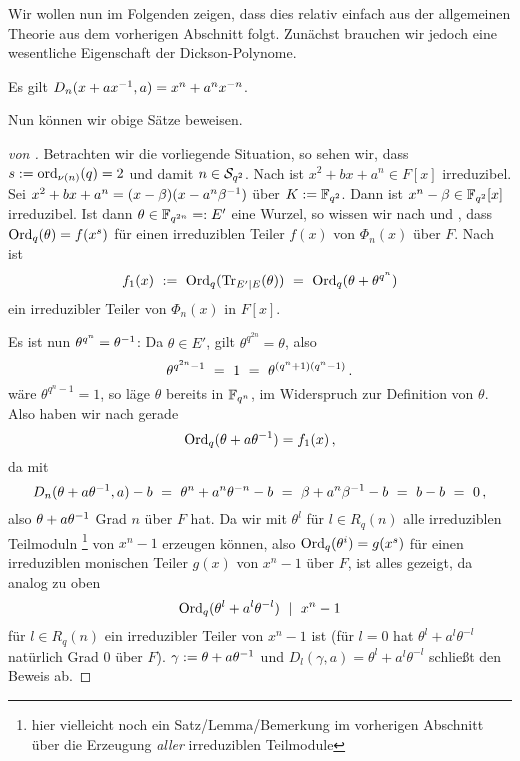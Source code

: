 Wir wollen nun im Folgenden zeigen, dass dies relativ einfach aus der
allgemeinen Theorie aus dem vorherigen Abschnitt folgt.
Zunächst brauchen wir jedoch eine wesentliche Eigenschaft der Dickson-Polynome.

\begin{lemma}[{??}]
  \label{lemma:dickson:dickson_polynome_potenz}
  Es gilt $D_n(x+a x\inv,a) = x^n + a^n x^{-n}$.
\end{lemma}

Nun können wir obige Sätze beweisen.

\begin{proof}[von ]
  Betrachten wir die vorliegende Situation, so sehen wir, dass
  $s := \ord_{\nu(n)}(q) = 2$ und damit $n \in \S_{q^2}$.
  Nach \thref{} ist $x^2 +bx+a^n \in F[x]$ irreduzibel. Sei 
  $x^2+bx+a^n = (x -\beta)(x -a^n\beta\inv)$ über $K := \F_{q^2}$.
  Dann ist $x^n-\beta \in \F_{q^2}[x]$ irreduzibel.
  Ist dann $\theta \in \F_{q^{2n}} =: E'$ eine Wurzel, so wissen wir nach
   und , dass
  $\Ord_q(\theta) = f(x^s)$ für einen irreduziblen Teiler $f(x)$ von
  $\Phi_n(x)$ über $F$. Nach 
  ist
  \[ f_1(x) \speq{:=} \Ord_q( \Tr_{E'\mid E}(\theta) ) \speq=
    \Ord_q(\theta + \theta^{q^n})\]
  ein irreduzibler Teiler von $\Phi_n(x)$ in $F[x]$.
  
  Es ist nun $\theta^{q^n} = \theta\inv$: 
  Da $\theta \in E'$, gilt $\theta^{q^{2n}} = \theta$, also
  \[ \theta^{q^{2n}-1} \speq= 1 \speq= \theta^{(q^n+1)(q^n-1)}\,. \]
  wäre $\theta^{q^n-1} = 1$, so läge $\theta$ bereits in $\F_{q^n}$, im Widerspruch
  zur Definition von $\theta$.
  Also haben wir nach  
  gerade 
  \[ \Ord_q(\theta + a\theta\inv) = f_1(x)\,,\]
  da mit 
  \[ D_n(\theta + a\theta\inv,a) -b \speq= \theta^n + a^n\theta^{-n} -b
    \speq= \beta +a^n\beta\inv -b \speq= b - b\speq= 0\,,\]
  also $\theta + a\theta\inv$ Grad $n$ über $F$ hat.
  Da wir mit $\theta^l$ für $l \in R_q(n)$ alle irreduziblen Teilmoduln
  \footnote{hier vielleicht noch ein Satz/Lemma/Bemerkung im vorherigen 
  Abschnitt über die Erzeugung \emph{aller} irreduziblen Teilmodule}
  von $x^n-1$ erzeugen können, also $\Ord_q(\theta^i) = g(x^s)$ für einen
  irreduziblen monischen Teiler $g(x)$ von $x^n-1$ über $F$, ist alles gezeigt,
  da analog zu oben
  \[ \Ord_q(\theta^l + a^l\theta^{-l}) \speq\mid x^n-1 \]
  für $l\in R_q(n)$ ein irreduzibler Teiler von $x^n-1$ ist
  (für $l=0$ hat $\theta^l+a^l\theta^{-l}$ natürlich Grad $0$ über $F$).
  $\gamma := \theta + a\theta\inv$ und $D_l(\gamma,a) =
  \theta^l+a^l\theta^{-l}$ schließt den Beweis ab.
\end{proof}
